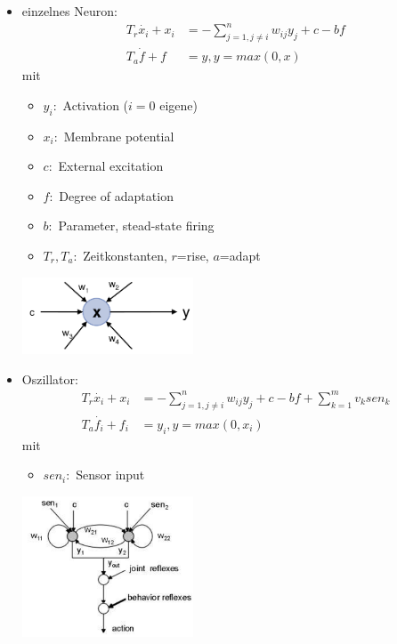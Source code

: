 \begin{itemize}
\item einzelnes Neuron: 
\begin{align*}
T_r\dot{x_i} + x_i &= - \sum\limits_{j = 1, j\neq i}^n w_{ij}y_j + c-bf\\
T_a\dot{f} + f &= y, y = max(0,x)
\end{align*} mit
\begin{itemize}
\item $y_i:$ Activation ($i=0$ eigene)
\item $x_i:$ Membrane potential
\item $c:$ External excitation
\item $f:$ Degree of adaptation
\item $b:$ Parameter, stead-state firing
\item $T_r, T_a:$ Zeitkonstanten, $r$=rise, $a$=adapt
\end{itemize}
\includegraphics[width=0.4\textwidth]{figures/ch05_matsuoka.png}
\item Oszillator:
\begin{align*}
T_r\dot{x_i} + x_i &= - \sum\limits_{j = 1, j\neq i}^n w_{ij}y_j + c-bf + \sum\limits_{k=1}^m v_k sen_k\\
T_a\dot{f_i} + f_i &= y_i, y = max(0,x_i)
\end{align*} mit
\begin{itemize}
\item $sen_i:$ Sensor input
\end{itemize}
\includegraphics[width=0.4\textwidth]{figures/ch05_matHalfCenter.png}

\end{itemize}
